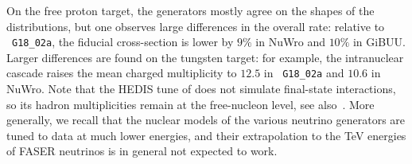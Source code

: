 On the free proton target, the generators mostly agree on the shapes of the distributions, but one observes large differences in the overall rate: relative to \genie~{\tt G18\_02a}, the fiducial cross-section is lower by $9\%$ in {\sc\small NuWro} and $10\%$ in {\sc\small GiBUU}.
%
Larger differences are found on the tungsten target: for example, the intranuclear cascade raises the mean charged multiplicity to $12.5$ in \genie~{\tt G18\_02a} and $10.6$ in {\sc\small NuWro}.
%
Note that the {\sc\small HEDIS} tune of \genie  does not simulate final-state interactions, so its hadron multiplicities remain at the free-nucleon level, see also~\cite{Feng:2022inv}.
%
More generally, we recall that the nuclear models of the various neutrino generators are tuned to data at much lower energies, and their extrapolation to the TeV energies of FASER neutrinos is in general not expected to work. 

